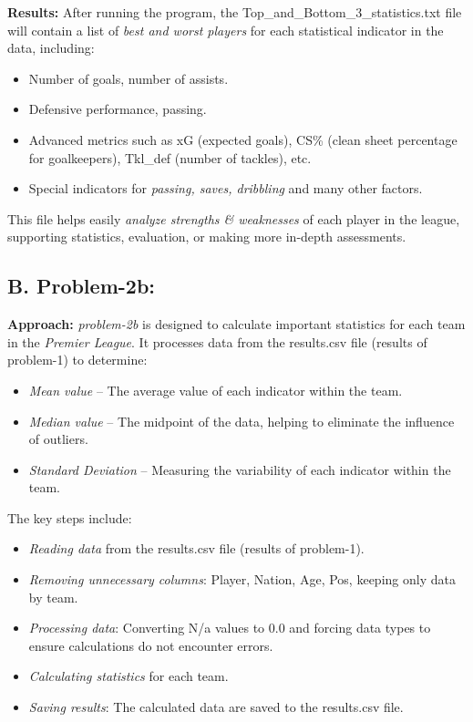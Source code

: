 \documentclass[12pt]{article}
\begin{document}
\textbf{Results:} After running the program, the Top\_and\_Bottom\_3\_statistics.txt file will contain a list of \textit{best and worst players} for each statistical indicator in the data, including:

\begin{itemize}
    \item Number of goals, number of assists.
    \item Defensive performance, passing.
    \item Advanced metrics such as xG (expected goals), CS\% (clean sheet percentage for goalkeepers), Tkl\_def (number of tackles), etc.
    \item Special indicators for \textit{passing, saves, dribbling} and many other factors.
\end{itemize}

This file helps easily \textit{analyze strengths \& weaknesses} of each player in the league, supporting statistics, evaluation, or making more in-depth assessments.

\subsection*{B. Problem-2b:}
\textbf{Approach:} \textit{problem-2b} is designed to calculate important statistics for each team in the \textit{Premier League}. It processes data from the results.csv file (results of problem-1) to determine:

\begin{itemize}
    \item \textit{Mean value} -- The average value of each indicator within the team.
    \item \textit{Median value} -- The midpoint of the data, helping to eliminate the influence of outliers.
    \item \textit{Standard Deviation} -- Measuring the variability of each indicator within the team.
\end{itemize}

The key steps include:

\begin{itemize}
    \item \textit{Reading data} from the results.csv file (results of problem-1).
    \item \textit{Removing unnecessary columns}: Player, Nation, Age, Pos, keeping only data by team.
    \item \textit{Processing data}: Converting N/a values to 0.0 and forcing data types to ensure calculations do not encounter errors.
    \item \textit{Calculating statistics} for each team.
    \item \textit{Saving results}: The calculated data are saved to the results.csv file.
\end{itemize}
\end{document}
